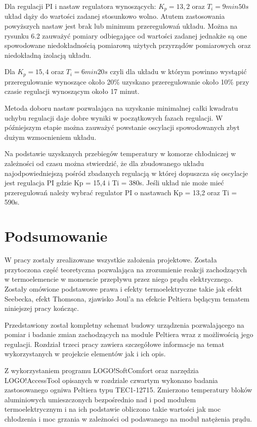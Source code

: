 \documentclass[oneside]{mgr}
\begin{document}
Dla regulacji PI i nastaw regulatora wynoszących: $K_p = 13,2$ oraz $T_i = 9 min 50s$ układ dąży do wartości zadanej stosunkowo wolno. Atutem zastosowania powyższych nastaw jest brak lub minimum przeregulowań układu. Można na rysunku 6.2 zauważyć pomiary odbiegające od wartości zadanej jednakże są one spowodowane niedokładnością pomiarową użytych przyrządów pomiarowych oraz niedokładną izolacją układu.

Dla $K_p = 15,4$ oraz $T_i = 6min 20s$ czyli dla układu w którym powinno wystąpić przeregulowanie wynoszące około 20\% uzyskano przeregulowanie około 10\% przy czasie regulacji wynoszącym około 17 minut.

Metoda doboru nastaw pozwalająca na uzyskanie minimalnej całki kwadratu uchybu regulacji daje dobre wyniki w początkowych fazach regulacji. W późniejszym etapie można zauważyć powstanie oscylacji spowodowanych zbyt dużym wzmocnieniem układu.

Na podstawie uzyskanych przebiegów temperatury w komorze chłodniczej w zależności od czasu można stwierdzić, że dla zbudowanego układu najodpowiedniejszą pośród zbadanych regulacją w której dopuszcza się oscylacje jest regulacja PI gdzie Kp = 15,4 i Ti = 380s. Jeśli układ nie może mieć przeregulowań należy wybrać regulator PI o nastawach Kp = 13,2 oraz Ti = 590s.

\chapter{Podsumowanie}
W pracy zostały zrealizowane wszystkie założenia projektowe. Została przytoczona część teoretyczna pozwalająca na zrozumienie reakcji zachodzących w termoelemencie w momencie przepływu przez niego prądu elektrycznego. Zostały omówione podstawowe prawa i efekty termoelektryczne takie jak efekt Seebecka, efekt Thomsona, zjawisko Joul'a na efekcie Peltiera będącym tematem niniejszej pracy kończąc.

Przedstawiony został kompletny schemat budowy urządzenia pozwalającego na pomiar i badanie zmian zachodzących na module Peltiera wraz z możliwością jego regulacji. Rozdział trzeci pracy zawiera szczegółowe informacje na temat wykorzystanych w projekcie elementów jak i ich opis.

Z wykorzystaniem programu LOGO!SoftComfort oraz narzędzia  LOGO!AccessTool opisanych w rozdziale czwartym wykonano badania zastosowanego ogniwa Peltiera typu TEC1-12715. Zmierzono temperatury bloków aluminiowych umieszczonych bezpośrednio nad i pod modułem termoelektrycznym i na ich podstawie obliczono takie wartości jak moc chłodzenia i moc grzania w zależności od podawanego na moduł natężenia prądu.
\end{document}
